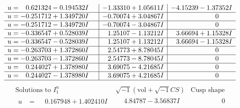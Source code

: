 \documentclass[1p]{elsarticle_modified}
\theoremstyle{definition}
\newcommand{\I}{\sqrt{-1}}
\begin{document}
$$\begin{array}{c|c|c}
\begin{aligned}
u &= \phantom{-}0.621324 - 0.194532 I\end{aligned}
 & -1.33310 + 1.05611 I & -4.15239 - 1.37352 I \\ \hline\begin{aligned}
u &= -0.251712 + 1.349720 I\end{aligned}
 & -0.70074 + 3.04867 I & \phantom{-0.000000 } 0 \\ \hline\begin{aligned}
u &= -0.251712 - 1.349720 I\end{aligned}
 & -0.70074 - 3.04867 I & \phantom{-0.000000 } 0 \\ \hline\begin{aligned}
u &= -0.336547 + 0.528039 I\end{aligned}
 & \phantom{-}1.25107 - 1.13212 I & \phantom{-}3.66694 + 1.15328 I \\ \hline\begin{aligned}
u &= -0.336547 - 0.528039 I\end{aligned}
 & \phantom{-}1.25107 + 1.13212 I & \phantom{-}3.66694 - 1.15328 I \\ \hline\begin{aligned}
u &= -0.263703 + 1.372860 I\end{aligned}
 & \phantom{-}2.54773 + 8.78045 I & \phantom{-0.000000 } 0 \\ \hline\begin{aligned}
u &= -0.263703 - 1.372860 I\end{aligned}
 & \phantom{-}2.54773 - 8.78045 I & \phantom{-0.000000 } 0 \\ \hline\begin{aligned}
u &= \phantom{-}0.244027 + 1.378980 I\end{aligned}
 & \phantom{-}3.69075 - 4.21685 I & \phantom{-0.000000 } 0 \\ \hline\begin{aligned}
u &= \phantom{-}0.244027 - 1.378980 I\end{aligned}
 & \phantom{-}3.69075 + 4.21685 I & \phantom{-0.000000 } 0\\
 \hline 
 \end{array}$$\newpage$$\begin{array}{c|c|c}  
\text{Solutions to }I^u_{1}& \I (\text{vol} + \sqrt{-1}CS) & \text{Cusp shape}\\
 \hline 
\begin{aligned}
u &= \phantom{-}0.167948 + 1.402410 I\end{aligned}
 & \phantom{-}4.84787 - 3.56837 I & \phantom{-0.000000 } 0 \\ \hline\begin{aligned}

\end{aligned}
\end{array}$$
\end{document}
